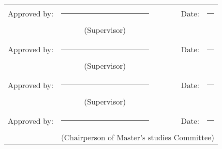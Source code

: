 \begin{center}
        \begin{singlespace}
            \normalsize
            \begin{tabular}{rlrl}
                Approved by: & \noindent\rule{5cm}{0.4pt} & \qquad Date: & \noindent\rule{3cm}{0.4pt} \\
                             & \multicolumn{1}{c}{(Supervisor)} & & \\
                             \\
                Approved by: & \noindent\rule{5cm}{0.4pt} & \qquad Date: & \noindent\rule{3cm}{0.4pt} \\
                             & \multicolumn{1}{c}{(Supervisor)} & & \\
                             \\
                Approved by: & \noindent\rule{5cm}{0.4pt} & \qquad Date: & \noindent\rule{3cm}{0.4pt} \\
                             & \multicolumn{1}{c}{(Supervisor)} & & \\
                             \\
                Approved by: & \noindent\rule{5cm}{0.4pt} & \qquad Date: & \noindent\rule{3cm}{0.4pt} \\
                             & \multicolumn{3}{c}{(Chairperson of Master's studies Committee)} \\
            \end{tabular}
        \end{singlespace}
    \end{center}